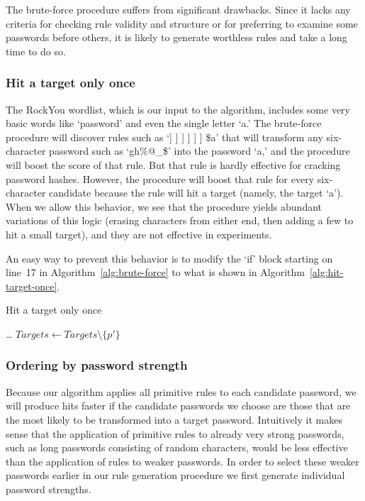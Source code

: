 \documentclass[letterpaper,twocolumn,10pt]{article}
\begin{document}
The brute-force procedure suffers from significant drawbacks. Since it lacks
any criteria for checking rule validity and structure or for preferring to
examine some passwords before others, it is likely to generate worthless rules
and take a long time to do so.

\subsubsection{Hit a target only once}

The RockYou wordlist, which is our input to the algorithm, includes some very
basic words like `password' and even the single letter `a.' The brute-force
procedure will discover rules such as `] ] ] ] ] ] \$a' that will transform any
six-character password such as `gh\%@\_\$' into the password `a,' and the
procedure will boost the score of that rule. But that rule is hardly effective
for cracking password hashes. However, the procedure will boost that rule for
every six-character candidate because the rule will hit a target (namely, the
target `a'). When we allow this behavior, we see that the procedure yields
abundant variations of this logic (erasing characters from either end, then
adding a few to hit a small target), and they are not effective in experiments.

An easy way to prevent this behavior is to modify the `if' block starting on
line~17 in Algorithm~\ref{alg:brute-force} to what is shown in
Algorithm~\ref{alg:hit-target-once}.

\begin{algorithm}\caption{Hit a target only once}
\begin{algorithmic}
        \State \dots
      \EndFor
      \State $Targets \gets Targets \setminus \{p'\}$
    \EndIf
\end{algorithmic}
\label{alg:hit-target-once}
\end{algorithm}

\subsubsection{Ordering by password strength}

Because our algorithm applies all primitive rules to each candidate password,
we will produce hits faster if the candidate passwords we choose are those that
are the most likely to be transformed into a target password. Intuitively it makes
sense that the application of primitive rules to already very strong passwords, such as long
passwords consisting of random characters, would be less effective than the application
of rules to weaker passwords. In order to select these weaker passwords earlier in
our rule generation procedure we first generate individual password strengths.
\end{document}
